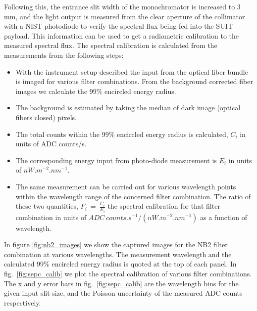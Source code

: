 \documentclass[12pt]{spieman}  %
\begin{document}
Following this, the entrance slit width of the monochromator is increased to 3 mm, and the light output is measured from the clear aperture of the collimator with a NIST photodiode to verify the spectral flux being fed into the SUIT payload. This information can be used to get a radiometric calibration to the measured spectral flux. The spectral calibration is calculated from the measurements from the following steps:

 \begin{itemize}
 \item With the instrument setup described the input from the optical fiber bundle is imaged for various filter combinations. From the background corrected fiber images we calculate the 99\% encircled energy radius.
 \item The background is estimated by taking the median of dark image (optical fibers closed) pixels.
 \item The total counts within the 99\% encircled energy radius is calculated, $C_{i}$ in units of ADC counts/s.
 \item The corresponding energy input from photo-diode measurement is $E_{i}$ in units of $nW.m^{-2}.nm^{-1}$.
 \item The same measurement can be carried out for various wavelength points within the wavelength range of the concerned filter combination. The ratio of these two quantities, $F_{i}~=~\frac{C_{i}}{E_{i}}$ 
the spectral calibration for that filter combination in units of $ADC~counts.s^{-1}/(nW.m^{-2}.nm^{-1})$ as a function of wavelength.
 \end{itemize}

In figure \ref{fig:nb2_images} we show the captured images for the NB2 filter combination at various wavelengths. The measurement wavelength and the calculated 99\% encircled energy radius is quoted at the top of each panel.  In fig.~\ref{fig:sepc_calib} we plot the spectral calibration of various filter combinations. The x and y error bars in fig.~\ref{fig:sepc_calib} are the wavelength bins for the given input slit size, and the Poisson uncertainty of the measured ADC counts respectively.
\end{document}
